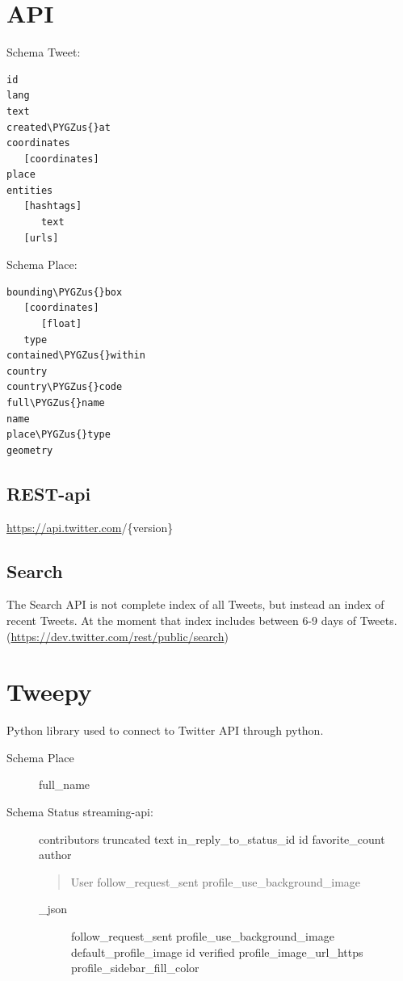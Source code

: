 \documentclass[letterpaper,10pt,english]{sphinxmanual}
\def\PYGZus{\char`\_}
\begin{document}
\section{API}
\label{main/twitter:api}
Schema Tweet:

\begin{Verbatim}[commandchars=\\\{\}]
id
lang
text
created\PYGZus{}at
coordinates
   [coordinates]
place
entities
   [hashtags]
      text
   [urls]
\end{Verbatim}

Schema Place:

\begin{Verbatim}[commandchars=\\\{\}]
bounding\PYGZus{}box
   [coordinates]
      [float]
   type
contained\PYGZus{}within
country
country\PYGZus{}code
full\PYGZus{}name
name
place\PYGZus{}type
geometry
\end{Verbatim}


\subsection{REST-api}
\label{main/twitter:rest-api}
\href{https://api.twitter.com}{https://api.twitter.com}/\{version\}


\subsection{Search}
\label{main/twitter:search}
The Search API is not complete index of all Tweets, but instead an index of recent Tweets.
At the moment that index includes between 6-9 days of Tweets. (\href{https://dev.twitter.com/rest/public/search}{https://dev.twitter.com/rest/public/search})


\section{Tweepy}
\label{main/twitter:tweepy}
Python library used to connect to Twitter API through python.
\begin{description}
\item[{Schema Place}] \leavevmode
full\_name

\item[{Schema Status streaming-api:}] \leavevmode
contributors
truncated
text
in\_reply\_to\_status\_id
id
favorite\_count
author
\begin{quote}

User
follow\_request\_sent
profile\_use\_background\_image
\end{quote}
\begin{description}
\item[{\_json}] \leavevmode
follow\_request\_sent
profile\_use\_background\_image
default\_profile\_image
id
verified
profile\_image\_url\_https
profile\_sidebar\_fill\_color

\end{description}

\end{description}
\end{document}
